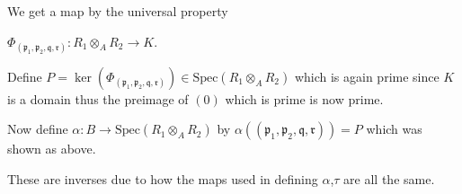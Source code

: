 \documentclass[12pt, letterpaper]{article}
\newcommand{\p}{\mathfrak{p}}
\newcommand{\Spec}{\mathrm{Spec}}
\newcommand{\mf}[1]{\mathfrak{#1}}
\begin{document}
\begin{problemproof}
    We get a map by the universal property

    $\Phi_{(\p_1,\p_2,\mf{q},\mf{r})} : R_1 \otimes_A R_2 \to K$.

    Define $P = \ker(\Phi_{(\p_1,\p_2,\mf{q},\mf{r})}) \in \Spec(R_1 \otimes_A R_2)$ which is again prime since $K$ is a domain thus the preimage of $(0)$ which is prime is now prime.

    Now define $\alpha : B \to \Spec(R_1 \otimes_A R_2)$ by $\alpha((\p_1,\p_2,\mf{q},\mf{r}))=P$ which was shown as above.

    These are inverses due to how the maps used in defining $\alpha$,$\tau$ are all the same.
\end{problemproof}
\end{document}
